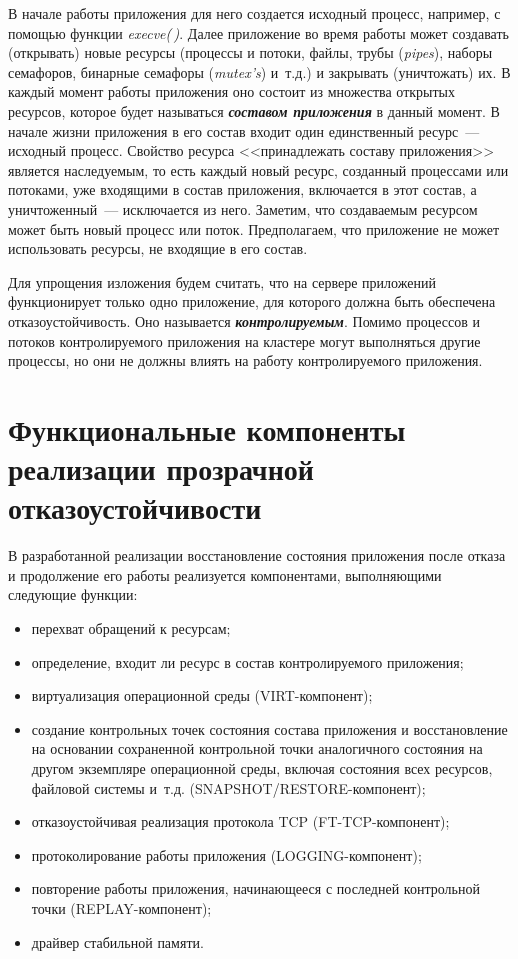 \begin{multicols}{2}
В начале работы приложения для него создается исходный процесс, например, с 
по\-мощью функции \emph{execve(\,)}. Далее приложение во время работы может 
создавать (открывать) новые ресурсы (процессы и потоки, файлы, трубы 
(\textit{pipes}), наборы семафоров, бинарные семафоры (\textit{mutex's}) 
и~т.д.) и закрывать (уничтожать) их. В каждый момент работы приложения оно 
состоит из множества открытых ресурсов, которое будет называться 
{\bfseries\textit{составом приложения}} в данный момент. В начале жизни 
приложения в его состав входит один единственный ресурс~--- исходный процесс. 
Свойство ресурса <<принадлежать составу приложения>> является наследуемым, то 
есть каждый новый ресурс, созданный процессами или потоками, уже входящими в 
состав приложения, включается в этот состав, а уничтоженный~--- исключается из 
него. Заметим, что создаваемым ресурсом может быть новый процесс или поток.  
Предполагаем, что приложение не может использовать ресурсы, не входящие в его 
состав.

Для упрощения изложения будем считать, что на сервере приложений
функционирует только одно приложение, для которого должна быть
обеспечена отказоустойчивость. Оно называется {\bfseries\textit{контролируемым}}. Помимо
процессов и потоков контролируемого приложения на кластере могут
выполняться другие процессы, но они не должны влиять на работу
контролируемого приложения.

\section{Функциональные компоненты реализации прозрачной
отказоустойчивости}

В разработанной реализации восстановление состояния приложения после отказа и 
продолжение его работы реализуется компонентами, вы\-пол\-ня\-ющи\-ми следующие 
функции:
\begin{itemize}
\item перехват обращений к ресурсам;
\item определение, входит ли ресурс в состав контролируемого приложения;
\item виртуализация операционной среды (VIRT-компонент);
\item создание контрольных точек состояния состава приложения и восстановление на
основании сохраненной контрольной точки аналогичного состояния на другом экземпляре
операционной среды, включая состояния всех ресурсов, файловой сис\-те\-мы и~т.д.
(SNAPSHOT/RESTORE-ком\-по\-нент);
\item отказоустойчивая реализация протокола TCP (FT-TCP-компонент);
\item протоколирование работы приложения (LOGGING-компонент);
\item повторение работы приложения, начинающееся с последней контрольной точки
(REPLAY-компонент);
\item драйвер стабильной памяти.
\end{itemize}


\end{multicols}
